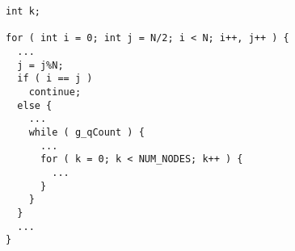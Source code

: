 \begin{lstlisting}[morekeywords={k},belowskip=0pt]
int k;

for ( int i = 0; int j = N/2; i < N; i++, j++ ) {
  ...
  j = j%N;
  if ( i == j )
    continue;
  else {
    ...
    while ( g_qCount ) {
      ...
      for ( k = 0; k < NUM_NODES; k++ ) {
        ...
      }
    }
  }
  ...
}

\end{lstlisting}
